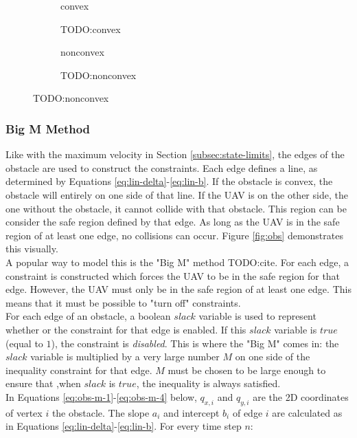 \begin{figure}[]
    \centering
    
    \begin{subfigure}[]{0.47\textwidth}
        convex
        \caption{TODO:convex}
        \label{fig:convex-example}
    \end{subfigure}
    \hfil
    \begin{subfigure}[]{0.47\textwidth}
        nonconvex
        \caption{TODO:nonconvex}
        \label{fig:nonconvex-example}
    \end{subfigure}
\end{figure}


\subsubsection{Big M Method}
Like with the maximum velocity in Section \ref{subsec:state-limits}, the edges of the obstacle are used to construct the constraints. Each edge defines a line, as determined by Equations \ref{eq:lin-delta}-\ref{eq:lin-b}. If the obstacle is convex, the obstacle will entirely on one side of that line. If the UAV is on the other side, the one without the obstacle, it cannot collide with that obstacle. This region can be consider the safe region defined by that edge. As long as the UAV is in the safe region of at least one edge, no collisions can occur. Figure \ref{fig:obs} demonstrates this visually. \\
A popular way to model this is the "Big M" method TODO:cite. For each edge, a constraint is constructed which forces the UAV to be in the safe region for that edge. However, the UAV must only be in the safe region of at least one edge. This means that it must be possible to "turn off" constraints. \\
For each edge of an obstacle, a boolean $slack$ variable is used to represent whether or the constraint for that edge is enabled. If this $slack$ variable is $true$ (equal to $1$), the constraint is \emph{disabled}. This is where the "Big M" comes in: the $slack$ variable is multiplied by a very large number $M$ on one side of the inequality constraint for that edge. $M$ must be chosen to be large enough to ensure that ,when $slack$ is $true$, the inequality is always satisfied. \\
In Equations \ref{eq:obs-m-1}-\ref{eq:obs-m-4} below, $q_{x,i}$ and $q_{y,i}$ are the 2D coordinates of vertex $i$ the obstacle. The slope $a_{i}$ and intercept $b_{i}$ of edge $i$ are calculated as in Equations \ref{eq:lin-delta}-\ref{eq:lin-b}. For every time step $n$:
